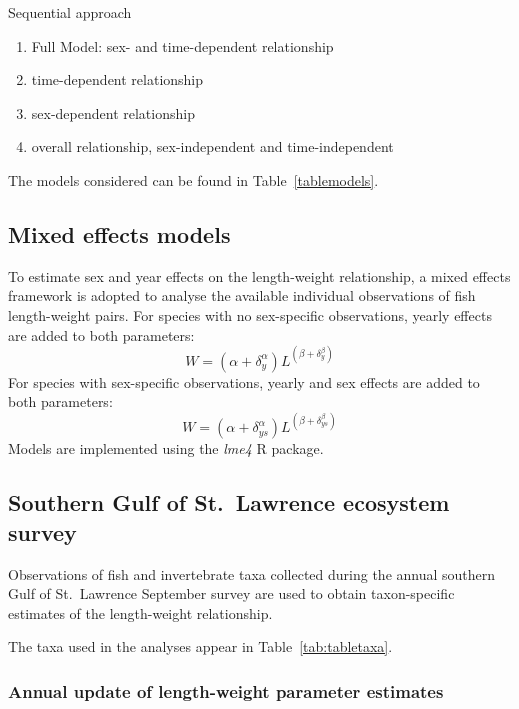 \documentclass[12pt]{article}\usepackage[]{graphicx}\usepackage[]{color}
\begin{document}
Sequential approach
\begin{enumerate}
\def\labelenumi{\arabic{enumi}.}

\item
  Full Model: sex- and time-dependent relationship
\item
  time-dependent relationship
\item
  sex-dependent relationship
\item
  overall relationship, sex-independent and time-independent
\end{enumerate}
The models considered can be found in Table~\ref{tablemodels}.

\subsection{Mixed effects models}\label{mixed-effects-models}

To estimate sex and year effects on the length-weight relationship, a mixed effects framework is adopted to analyse the available individual observations of fish length-weight pairs. For species with no sex-specific observations, yearly effects are added to both parameters:
\begin{equation}
W =  \left(\alpha +\delta^{\alpha}_{y}\right)L^{\left(\beta +\delta^{\beta}_{y} \right)}
\end{equation}
For species with sex-specific observations, yearly and sex effects are added to both parameters:
\begin{equation}
W =  \left(\alpha +\delta^{\alpha}_{ys}\right)L^{\left(\beta +\delta^{\beta}_{ys} \right)}
\end{equation}
Models are implemented using the \emph{lme4} R package.

\subsection{Southern Gulf of St.~Lawrence ecosystem survey}\label{southern-gulf-of-st.-lawrence-ecosystem-survey}

Observations of fish and invertebrate taxa collected during the annual southern Gulf of St.~Lawrence September survey are used to obtain taxon-specific estimates of the length-weight relationship.

The taxa used in the analyses appear in Table~\ref{tab:tabletaxa}.

\subsubsection{Annual update of length-weight parameter estimates}\label{annual-update-of-length-weight-parameter-estimates}
\end{document}
